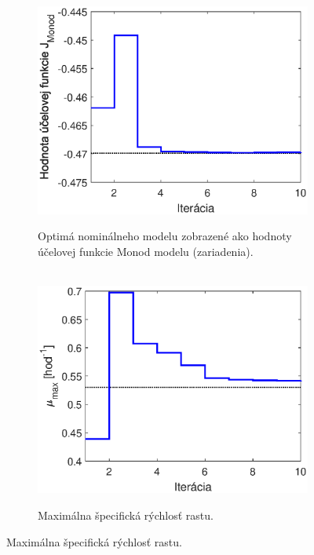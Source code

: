 \begin{figure}
	\centering
	\begin{subfigure}[b]{0.49\textwidth}
		\centering\
		\includegraphics[width=\linewidth]{images/TwoStep_cost_fun}
		\caption{Optimá nominálneho modelu zobrazené ako hodnoty účelovej funkcie Monod modelu (zariadenia).}
		\label{fig:twostep_opt_costFun}
	\end{subfigure}
	\begin{subfigure}[b]{0.49\textwidth}
		\centering\
		\includegraphics[width=\linewidth]{images/TwoStep_mu}
		\caption{Maximálna špecifická rýchlosť rastu. \newline \newline}
		\label{fig:twostep_opt_muMax}
	\end{subfigure}


\end{figure}
